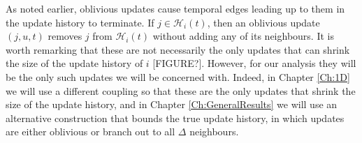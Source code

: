 	As noted earlier, oblivious updates cause temporal edges leading up to them in the update history to terminate. If $j \in \mathcal{H}_i(t)$, then an oblivious update $(j, u, t)$ removes $j$ from $\mathcal{H}_i(t)$ without adding any of its neighbours. It is worth remarking that these are not necessarily the only updates that can shrink the size of the update history of $i$ [FIGURE?]. However, for our analysis they will be the only such updates we will be concerned with. Indeed, in Chapter \ref{Ch:1D} we will use a different coupling so that these are the only updates that shrink the size of the update history, and in Chapter \ref{Ch:GeneralResults} we will use an alternative construction that bounds the true update history, in which updates are either oblivious or branch out to all $\Delta$ neighbours.

	

